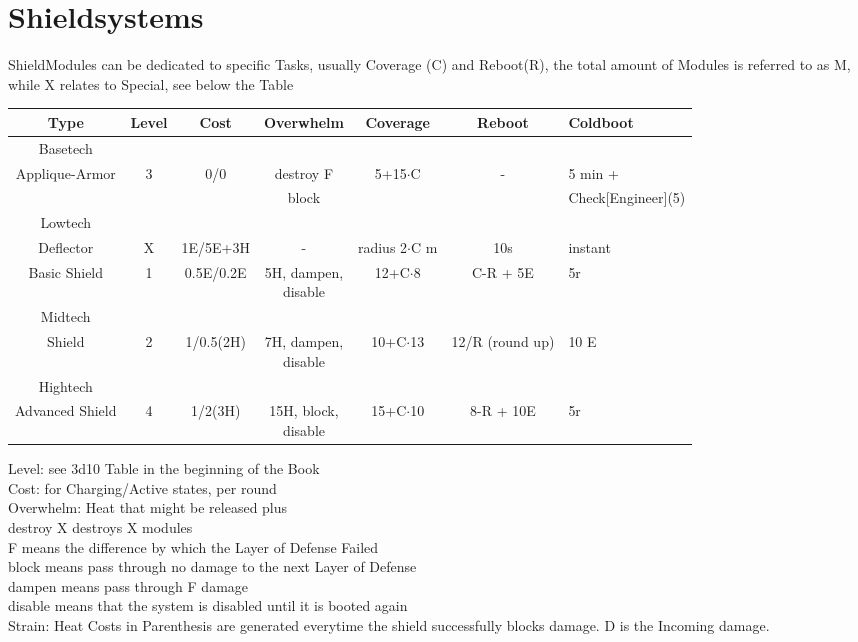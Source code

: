 \section{Shieldsystems}\label{sec:shieldsystems}
ShieldModules can be dedicated to specific Tasks, usually
Coverage (C) and Reboot(R), the total amount of Modules is referred to as M, while
X relates to Special, see below the Table\newline
\begin{tabular}{c|cccccl}
    Type & Level & Cost & Overwhelm & Coverage & Reboot & Coldboot \\
    \hline Basetech\\
    Applique-Armor & 3 & 0/0 & destroy F& 5+15\(\cdot\)C & -  & 5 min + \\
    &&&block&&& Check[Engineer](5) \\
    \hline Lowtech\\
    Deflector & X & 1E/5E+3H & - & radius 2\(\cdot\)C m & 10s & instant \\
    Basic Shield & 1 & 0.5E/0.2E & \makecell{5H, dampen, \\ disable}&12+C\(\cdot\)8 & C-R + 5E & 5r \\
    \hline Midtech\\
    Shield & 2 & 1/0.5(2H) & \makecell{7H, dampen,\\ disable} & 10+C\(\cdot\)13 & 12/R (round up) & 10 E \\
    \hline Hightech\\
    Advanced Shield & 4 & 1/2(3H) & \makecell{15H, block,\\ disable}& 15+C\(\cdot\)10 & 8-R + 10E & 5r \\
\end{tabular}\newline\newline\newline
Level: see 3d10 Table in the beginning of the Book\\
Cost: for Charging/Active states, per round\\
Overwhelm: Heat that might be released plus \\
\tab destroy X destroys X modules\\
\tab F means the difference by which the Layer of Defense Failed\\
\tab block means pass through no damage to the next Layer of Defense\\
\tab dampen means pass through F damage\\
\tab disable means that the system is disabled until it is booted again\\
\newline
Strain: Heat Costs in Parenthesis are generated everytime the shield successfully blocks damage.
D is the Incoming damage.
\pagebreak[2]
